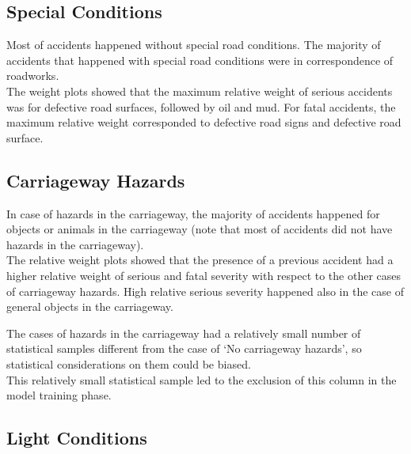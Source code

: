 \documentclass[11pt]{article}
\begin{document}
    \hypertarget{special-conditions}{%
\subsection{Special Conditions}\label{special-conditions}}

    \begin{center}
    \end{center}

Most of accidents happened without special road conditions. The majority of accidents that happened with special road conditions were in correspondence of roadworks.\\
The weight plots showed that the maximum relative weight of serious accidents was for defective road surfaces, followed by oil and mud. For fatal accidents, the maximum relative weight corresponded to defective road signs and defective road surface.

    \hypertarget{carriageway-hazards}{%
\subsection{Carriageway Hazards}\label{carriageway-hazards}}

    \begin{center}
    \end{center}

In case of hazards in the carriageway, the majority of accidents happened for objects or animals in the carriageway (note that most of accidents did not have hazards in the carriageway).\\
The relative weight plots showed that the presence of a previous accident had a higher relative weight of serious and fatal severity with respect to the other cases of carriageway hazards. High relative serious severity happened also in the case of general objects in the carriageway.

The cases of hazards in the carriageway had a relatively small number of statistical samples different from the case of `No carriageway hazards', so statistical considerations on them could be biased.\\
This relatively small statistical sample led to the exclusion of this column in the model training phase.

    \hypertarget{light-conditions}{%
\subsection{Light Conditions}\label{light-conditions}}
\end{document}
